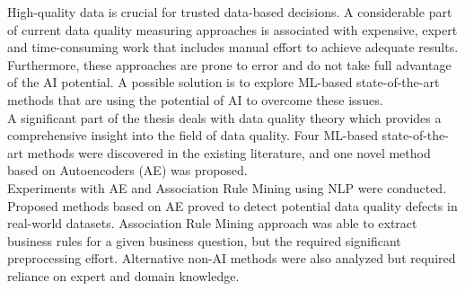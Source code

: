 High-quality data is crucial for trusted data-based decisions. A considerable part of current data quality measuring approaches is associated with expensive, expert and time-consuming work that includes manual effort to achieve adequate results. Furthermore, these approaches are prone to error and do not take full advantage of the AI potential. A possible solution is to explore ML-based state-of-the-art methods that are using the potential of AI to overcome these issues.\\
\hspace*{5mm} A significant part of the thesis deals with data quality theory which provides a comprehensive insight into the field of data quality. Four ML-based state-of-the-art methods were discovered in the existing literature, and one novel method based on Autoencoders (AE) was proposed.\\
\hspace*{5mm} Experiments with AE and Association Rule Mining using NLP were conducted. Proposed methods based on AE proved to detect potential data quality defects in real-world datasets. Association Rule Mining approach was able to extract business rules for a given business question, but the required significant preprocessing effort. Alternative non-AI methods were also analyzed but required reliance on expert and domain knowledge.

